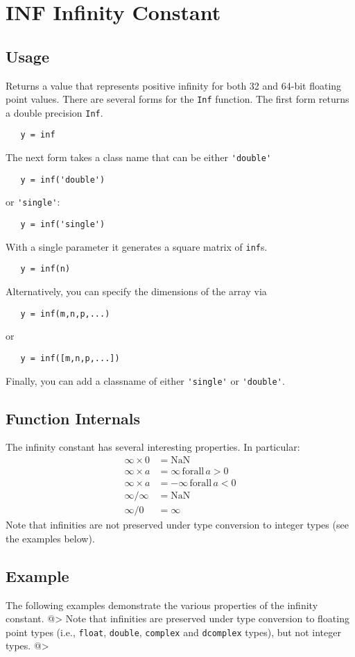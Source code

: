 \section{INF Infinity Constant}

\subsection{Usage}

Returns a value that represents positive infinity 
for both 32 and 64-bit floating point values. 
There are several forms for the \verb|Inf| function.
The first form returns a double precision \verb|Inf|.
\begin{verbatim}
   y = inf
\end{verbatim}
The next form takes a class name that can be either \verb|'double'| 
\begin{verbatim}
   y = inf('double')
\end{verbatim}
or \verb|'single'|:
\begin{verbatim}
   y = inf('single')
\end{verbatim}
With a single parameter it generates a square matrix of \verb|inf|s.
\begin{verbatim}
   y = inf(n)
\end{verbatim}
Alternatively, you can specify the dimensions of the array via
\begin{verbatim}
   y = inf(m,n,p,...)
\end{verbatim}
or
\begin{verbatim}
   y = inf([m,n,p,...])
\end{verbatim}
Finally, you can add a classname of either \verb|'single'| or \verb|'double'|.
\subsection{Function Internals}

The infinity constant has
several interesting properties.  In particular:
\[
\begin{array}{ll}
   \infty \times 0 & = \mathrm{NaN} \\                                             \infty \times a & = \infty \, \mathrm{for all} \, a > 0 \\   \infty \times a & = -\infty \, \mathrm{for all} \, a < 0 \\   \infty / \infty & = \mathrm{NaN} \\   \infty / 0 & = \infty 
\end{array}
\]
Note that infinities are not preserved under type conversion to integer types (see the examples below).
\subsection{Example}

The following examples demonstrate the various properties of the infinity constant.
@>
Note that infinities are preserved under type conversion to floating point types (i.e., \verb|float|, \verb|double|, \verb|complex| and \verb|dcomplex| types), but not integer  types.
@>
